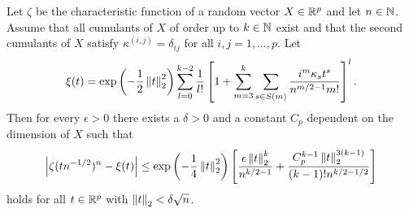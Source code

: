 \begin{theorem} \label{thm-edge-inv-tech}
    Let $\zeta$ be the characteristic function of a random vector $X \in {\mathbb{R}^p}$ and let $n \in \mathbb{N}$. Assume that all cumulants of $X$ of order up to $k \in \mathbb{N}$ exist and that the second cumulants of $X$ satisfy $\kappa^{(i, j)} = \delta_{ij}$ for all $i, j = 1, \ldots, p$. Let
    \begin{equation} \label{eq-edgeworth-fourier}
        \xi(t) = \exp\left(-\frac{1}{2}\left\lVert t\right\rVert_2^2\right)\sum_{l=0}^{k-2} \frac{1}{l!} \left[ 1 + \sum_{m=3}^k \sum_{s \in S(m)} \frac{i^m\kappa_s t^s}{n^{m/2-1}m!} \right]^l.
    \end{equation}
    Then for every $\epsilon > 0$ there exists a $\delta > 0$ and a constant $C_p$ dependent on the dimension of $X$ such that 
    \begin{equation}\label{eq-edge-bound}
        \left|\zeta(t n^{-1/2})^n - \xi(t)\right| \leq \exp\left(-\frac{1}{4}\left\lVert t\right\rVert_2^2\right)\left[ \frac{\epsilon\left\lVert t\right\rVert_2^k}{n^{k/2-1}} + \frac{C_p^{k-1}\left\lVert t\right\rVert_2^{3(k-1)}}{(k-1)!n^{k/2-1/2}} \right]
    \end{equation}
    holds for all $t \in {\mathbb{R}^p}$ with $\left\lVert t\right\rVert_2 < \delta\sqrt{n}$.
\end{theorem}
